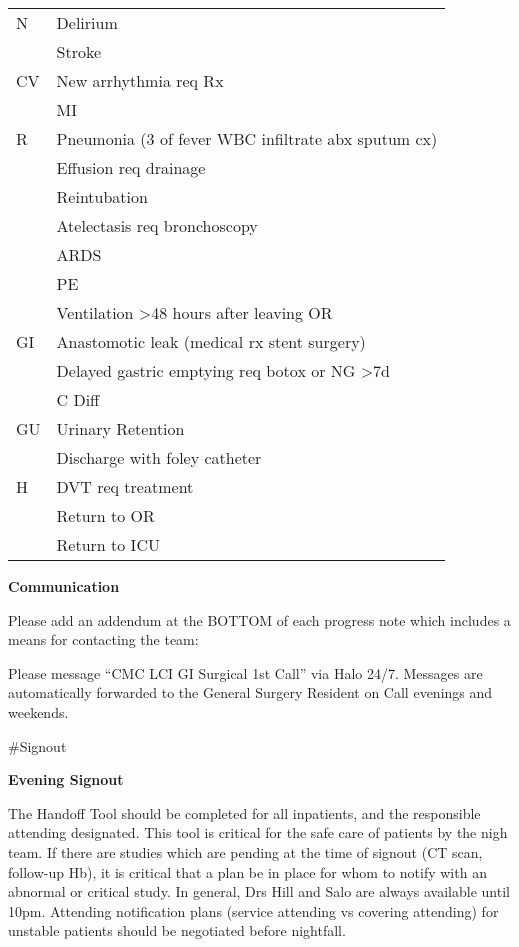 \documentclass[
]{book}
\begin{document}
\begin{longtable}[]{@{}ll@{}}
\toprule
& \\
\midrule
\endhead
N & Delirium \\
& Stroke \\
CV & New arrhythmia req Rx \\
& MI \\
R & Pneumonia (3 of fever \textbar{} WBC \textbar{} infiltrate \textbar{} abx \textbar{} sputum cx) \\
& Effusion req drainage \\
& Reintubation \\
& Atelectasis req bronchoscopy \\
& ARDS \\
& PE \\
& Ventilation \textgreater48 hours after leaving OR \\
GI & Anastomotic leak (medical rx \textbar{} stent \textbar{} surgery) \\
& Delayed gastric emptying req botox or NG \textgreater7d \\
& C Diff \\
GU & Urinary Retention \\
& Discharge with foley catheter \\
H & DVT req treatment \\
& Return to OR \\
& Return to ICU \\
\bottomrule
\end{longtable}

\textbf{Communication}

Please add an addendum at the BOTTOM of each progress note which includes a means for contacting the team:

Please message ``CMC LCI GI Surgical 1st Call'' via Halo 24/7. Messages are automatically forwarded to the General Surgery Resident on Call evenings and weekends.

\#Signout

\textbf{Evening Signout}

The Handoff Tool should be completed for all inpatients, and the responsible attending designated. This tool is critical for the safe care of patients by the nigh team. If there are studies which are pending at the time of signout (CT scan, follow-up Hb), it is critical that a plan be in place for whom to notify with an abnormal or critical study. In general, Drs Hill and Salo are always available until 10pm. Attending notification plans (service attending vs covering attending) for unstable patients should be negotiated before nightfall.
\end{document}
